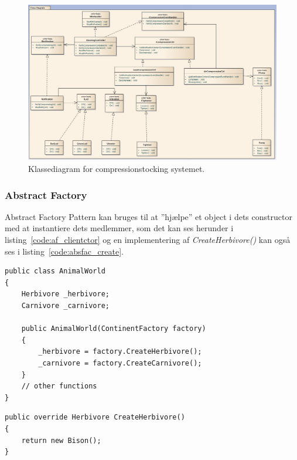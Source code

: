 \begin{figure}[H]
	\centering
	\includegraphics[width=0.9\linewidth]{figs/compressionstockings_classdiagram}
	\caption{Klassediagram for compressionstocking systemet.}
	\label{fig:compressionstockings_classdiagram}
\end{figure}

\subsubsection{Abstract Factory}

Abstract Factory Pattern kan bruges til at ''hjælpe'' et object i dets constructor med at instantiere dets medlemmer, som det kan ses herunder i listing~\ref{code:af_clientctor} og en implementering af \textit{CreateHerbivore()} kan også ses i listing~\ref{code:absfac_create}.

\begin{lstlisting}[caption=Abstract Factory brugt i Client Constructor().,
label=code:af_clientctor,
morekeywords={ContinentFactory, Herbivore, Carnivore}]
public class AnimalWorld
{
	Herbivore _herbivore;
	Carnivore _carnivore;
	
	public AnimalWorld(ContinentFactory factory)
	{
		_herbivore = factory.CreateHerbivore();
		_carnivore = factory.CreateCarnivore();
	}
	// other functions
}
\end{lstlisting}

\begin{lstlisting}[caption=Eksempel på implementering af CreateHerbivore metode.,
label=code:absfac_create,
morekeywords={ContinentFactory, Herbivore, Carnivore,override}]
public override Herbivore CreateHerbivore()
{
	return new Bison();
}

\end{lstlisting}


